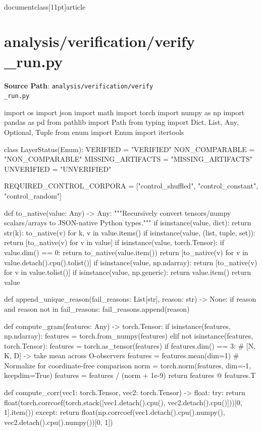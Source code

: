 \\documentclass[11pt]{article}
\begin{document}
\section*{analysis/verification/verify\\_run.py}
\textbf{Source Path}: \texttt{analysis/verification/verify\\_run.py}\par
\bigskip
\begin{CodeBlock}
import os
import json
import math
import torch
import numpy as np
import pandas as pd
from pathlib import Path
from typing import Dict, List, Any, Optional, Tuple
from enum import Enum
import itertools

class LayerStatus(Enum):
    VERIFIED = "VERIFIED"
    NON_COMPARABLE = "NON_COMPARABLE"
    MISSING_ARTIFACTS = "MISSING_ARTIFACTS"
    UNVERIFIED = "UNVERIFIED"


REQUIRED_CONTROL_CORPORA = ["control_shuffled", "control_constant", "control_random"]

def to_native(value: Any) -> Any:
    """Recursively convert tensors/numpy scalars/arrays to JSON-native Python types."""
    if isinstance(value, dict):
        return {str(k): to_native(v) for k, v in value.items()}
    if isinstance(value, (list, tuple, set)):
        return [to_native(v) for v in value]
    if isinstance(value, torch.Tensor):
        if value.dim() == 0:
            return to_native(value.item())
        return [to_native(v) for v in value.detach().cpu().tolist()]
    if isinstance(value, np.ndarray):
        return [to_native(v) for v in value.tolist()]
    if isinstance(value, np.generic):
        return value.item()
    return value

def append_unique_reason(fail_reasons: List[str], reason: str) -> None:
    if reason and reason not in fail_reasons:
        fail_reasons.append(reason)

def compute_gram(features: Any) -> torch.Tensor:
    if isinstance(features, np.ndarray):
        features = torch.from_numpy(features)
    elif not isinstance(features, torch.Tensor):
        features = torch.as_tensor(features)
    if features.dim() == 3: # [N, K, D] -> take mean across O-observers
        features = features.mean(dim=1)
    # Normalize for coordinate-free comparison
    norm = torch.norm(features, dim=-1, keepdim=True)
    features = features / (norm + 1e-9)
    return features @ features.T

def compute_corr(vec1: torch.Tensor, vec2: torch.Tensor) -> float:
    try:
        return float(torch.corrcoef(torch.stack([vec1.detach().cpu(), vec2.detach().cpu()]))[0, 1].item())
    except:
        return float(np.corrcoef(vec1.detach().cpu().numpy(), vec2.detach().cpu().numpy())[0, 1])



\end{CodeBlock}
\end{document}
